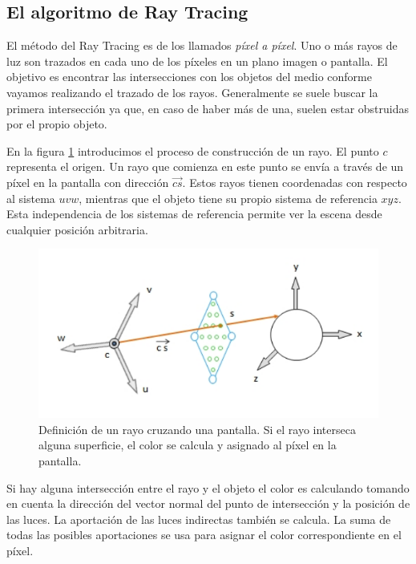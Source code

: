 \subsection{El algoritmo de Ray Tracing}

El método del Ray Tracing es de los llamados{ \em píxel a píxel}. Uno o más rayos de luz son trazados en cada uno de los píxeles en un plano imagen o pantalla. El objetivo es encontrar las intersecciones con los objetos del medio conforme vayamos realizando el trazado de los rayos. Generalmente se suele buscar la primera intersección ya que, en caso de haber más de una, suelen estar obstruidas por el propio objeto.

En la figura \ref{florez27} introducimos el proceso de construcción de un rayo. El punto $c$ representa el origen. Un rayo que comienza en este punto se envía a través de un píxel en la pantalla con dirección $\vec{cs}$. Estos rayos tienen coordenadas con respecto al sistema $uvw$, mientras que el objeto tiene su propio sistema de referencia $xyz$. Esta independencia de los sistemas de referencia permite ver la escena desde cualquier posición arbitraria.

\begin{figure}[h]
\centering
\includegraphics[scale=0.5]{images/florez2.png}
\caption{Definición de un rayo cruzando una pantalla. Si el rayo interseca alguna superficie, el color se calcula y asignado al píxel en la pantalla.}
\label{florez27}
\end{figure}

Si hay alguna intersección entre el rayo y el objeto el color es calculando tomando en cuenta la dirección del vector normal del punto de intersección y la posición de las luces. La aportación de las luces indirectas también se calcula. La suma de todas las posibles aportaciones se usa para asignar el color correspondiente en el píxel.

